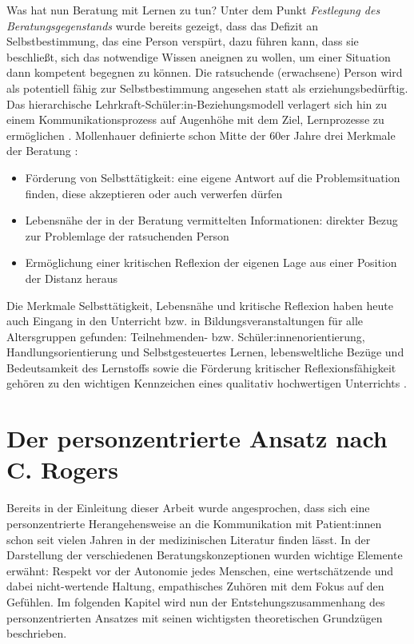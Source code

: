 \documentclass[
  twoside,
  parskip=half-,
  paper=176mm:246mm,
  BCOR=14mm,
  DIV=14,
]{scrreprt}
\begin{document}
Was hat nun Beratung mit Lernen zu tun? Unter dem Punkt \textit{Festlegung des Beratungsgegenstands} wurde bereits gezeigt, dass das Defizit an Selbstbestimmung, das eine Person verspürt, dazu führen kann, dass sie beschließt, sich das notwendige Wissen aneignen zu wollen, um einer Situation dann kompetent begegnen zu können.  Die ratsuchende (erwachsene) Person wird als potentiell fähig zur Selbstbestimmung angesehen statt als erziehungsbedürftig. Das hierarchische Lehrkraft-Schüler:in-Beziehungsmodell verlagert sich hin zu einem Kommunikationsprozess auf Augenhöhe mit dem Ziel, Lernprozesse zu ermöglichen \autocite[vgl.][188]{dinkelaker}. Mollenhauer definierte schon Mitte der 60er Jahre drei Merkmale der Beratung \autocite[Mollenhauer 1965, zit.nach][189]{dinkelaker}:
\begin{itemize}
  \item Förderung von Selbsttätigkeit: eine eigene Antwort auf die Problemsituation finden, diese akzeptieren oder auch verwerfen dürfen
  \item Lebensnähe der in der Beratung vermittelten Informationen: direkter Bezug zur Problemlage der ratsuchenden Person
  \item Ermöglichung einer kritischen Reflexion der eigenen Lage aus einer Position der Distanz heraus
\end{itemize}

Die Merkmale Selbsttätigkeit, Lebensnähe und kritische Reflexion haben heute auch Eingang in den Unterricht bzw. in Bildungsveranstaltungen für alle Altersgruppen gefunden: Teilnehmenden- bzw. Schüler:innenorientierung, Handlungsorientierung und Selbstgesteuertes Lernen, lebensweltliche Bezüge und Bedeutsamkeit des Lernstoffs sowie die Förderung kritischer Reflexionsfähigkeit gehören zu den wichtigen Kennzeichen eines qualitativ hochwertigen Unterrichts \autocite[vgl.][Kap. 5.3]{hippel}.

\chapter{Der personzentrierte Ansatz nach C. Rogers}\label{chapter:rogers}

Bereits in der Einleitung dieser Arbeit wurde angesprochen, dass sich eine personzentrierte Herangehensweise an die Kommunikation mit Patient:innen schon seit vielen Jahren in der medizinischen Literatur finden lässt. In der Darstellung der verschiedenen Beratungskonzeptionen wurden wichtige Elemente erwähnt: Respekt vor der Autonomie jedes Menschen, eine wertschätzende und dabei nicht-wertende Haltung, empathisches Zuhören mit dem Fokus auf den Gefühlen. Im folgenden Kapitel wird nun der Entstehungszusammenhang des personzentrierten Ansatzes mit seinen wichtigsten theoretischen Grundzügen beschrieben. 
\end{document}
